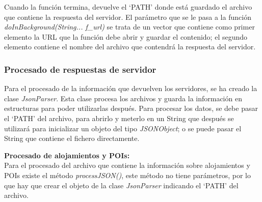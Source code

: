 Cuando la función termina, devuelve el \enquote*{PATH} donde está guardado el archivo que contiene la respuesta del servidor. El parámetro que se le pasa a la función \textit{doInBackground(String... f\_url)} se trata de un vector que contiene como primer elemento la URL que la función debe abrir y guardar el contenido; el segundo elemento contiene el nombre del archivo que contendrá la respuesta del servidor.
\subsubsection{Procesado de respuestas de servidor}
Para el procesado de la información que devuelven los servidores, se ha creado la clase \textit{JsonParser}. Esta clase procesa los archivos y guarda la información en estructuras para poder utilizarlas después. Para procesar los datos, se debe pasar el \enquote*{PATH} del archivo, para abrirlo y meterlo en un String que después se utilizará para inicializar un objeto del tipo \textit{JSONObject}; o se puede pasar el String que contiene el fichero directamente.\newline

\vspace{0.06in}
\textbf{Procesado de alojamientos y POIs:}\\
Para el procesado del archivo que contiene la información sobre alojamientos y POIs existe el método \textit{processJSON()}, este método no tiene parámetros, por lo que hay que crear el objeto de la clase \textit{JsonParser} indicando el \enquote*{PATH} del archivo.\newline

